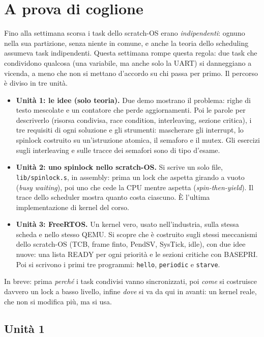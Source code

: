 \section{A prova di coglione}
Fino alla settimana scorsa i task dello scratch-OS erano \emph{indipendenti}: ognuno nella sua partizione, senza niente in comune, e anche la teoria dello scheduling assumeva task indipendenti. Questa settimana rompe questa regola: due task che condividono qualcosa (una variabile, ma anche solo la UART) si danneggiano a vicenda, a meno che non si mettano d'accordo su chi passa per primo. Il percorso è diviso in tre unità.

\begin{itemize}
    \item \textbf{Unità 1: le idee (solo teoria).} Due demo mostrano il problema: righe di testo mescolate e un contatore che perde aggiornamenti. Poi le parole per descriverlo (risorsa condivisa, race condition, interleaving, sezione critica), i tre requisiti di ogni soluzione e gli strumenti: mascherare gli interrupt, lo spinlock costruito su un'istruzione atomica, il semaforo e il mutex. Gli esercizi sugli interleaving e sulle tracce dei semafori sono di tipo d'esame.
    \item \textbf{Unità 2: uno spinlock nello scratch-OS.} Si scrive un solo file, \texttt{lib/spinlock.s}, in assembly: prima un lock che aspetta girando a vuoto (\emph{busy waiting}), poi uno che cede la CPU mentre aspetta (\emph{spin-then-yield}). Il trace dello scheduler mostra quanto costa ciascuno. È l'ultima implementazione di kernel del corso.
    \item \textbf{Unità 3: FreeRTOS.} Un kernel vero, usato nell'industria, sulla stessa scheda e nello stesso QEMU. Si scopre che è costruito sugli stessi meccanismi dello scratch-OS (TCB, frame finto, PendSV, SysTick, idle), con due idee nuove: una lista READY per ogni priorità e le sezioni critiche con BASEPRI. Poi si scrivono i primi tre programmi: \texttt{hello}, \texttt{periodic} e \texttt{starve}.
\end{itemize}

In breve: prima \emph{perché} i task condivisi vanno sincronizzati, poi \emph{come} si costruisce davvero un lock a basso livello, infine \emph{dove} si va da qui in avanti: un kernel reale, che non si modifica più, ma si usa.

\subsection{Unità 1}

